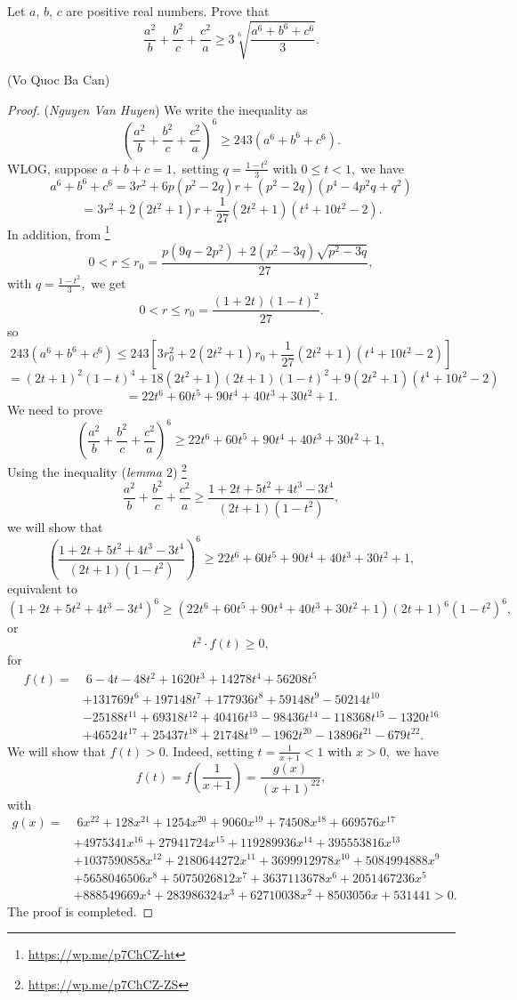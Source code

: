 \documentclass[12pt,a4paper]{book}
\begin{document}
\begin{pro}
Let $a,\,b,\,c$ are positive real numbers. Prove that
\[\frac{a^2}{b}+\frac{b^2}{c}+\frac{c^2}{a} \ge 3\sqrt[6]{\frac{a^6+b^6+c^6}{3}}.\]
\vspace{-1.3cm}
\begin{flushright}(Vo Quoc Ba Can)\end{flushright}
\end{pro}

\begin{proof}
(\textit{Nguyen Van Huyen}) We write the inequality as
\[\left(\frac{a^2}{b}+\frac{b^2}{c}+\frac{c^2}{a}\right)^6 \ge 243(a^6+b^6+c^6).\]
WLOG, suppose $a+b+c=1,$ setting $q=\frac{1-t^2}{3}$ with $0 \le t < 1, $ we have
\[a^6+b^6+c^6=3r^2+6p(p^2-2q)r+(p^2-2q)(p^4-4p^2q+q^2)\]
\[=3r^2+2(2t^2+1)r+\frac{1}{27}(2t^2+1)(t^4+10t^2-2).\]
In addition, from \footnote{\url{https://wp.me/p7ChCZ-ht}}
\[0 < r \leqslant r_0 = \frac{p(9q-2p^2)+2(p^2-3q)\sqrt{p^2-3q}}{27},\]
with $q=\frac{1-t^2}{3},$ we get
\[0 < r \leqslant r_0 = \frac{(1+2t)(1-t)^2}{27}.\]
so
\[243(a^6+b^6+c^6) \leqslant 243\left[3r_0^2+2(2t^2+1)r_0+\frac{1}{27}(2t^2+1)(t^4+10t^2-2)\right]\]
\[=(2t+1)^2(1-t)^4+18(2t^2+1)(2t+1)(1-t)^2+9(2t^2+1)(t^4+10t^2-2)\]
\[=22t^6+60t^5+90t^4+40t^3+30t^2+1.\]
We need to prove
\[\left(\frac{a^2}{b}+\frac{b^2}{c}+\frac{c^2}{a}\right)^6 \ge 22t^6+60t^5+90t^4+40t^3+30t^2+1,\]
Using the inequality (\textit{lemma $2$}) \footnote{\url{https://wp.me/p7ChCZ-ZS}}
\[\frac{a^2}{b}+\frac{b^2}{c}+\frac{c^2}{a} \ge \frac{1+2t+5t^2+4t^3-3t^4}{(2t+1)(1-t^2)},\]
we will show that
\[\left(\frac{1+2t+5t^2+4t^3-3t^4}{(2t+1)(1-t^2)}\right)^6 \ge 22t^6+60t^5+90t^4+40t^3+30t^2+1,\]
equivalent to
\[(1+2t+5t^2+4t^3-3t^4)^6 \ge (22t^6+60t^5+90t^4+40t^3+30t^2+1)(2t+1)^6(1-t^2)^6,\]
or
\[t^2 \cdot f(t) \geq 0,\]
for
\[\begin{aligned}
f(t) = & \; 6-4t-48t^2+1620t^3+14278t^4+56208t^5
\\&+131769t^6+197148t^7+177936t^8+59148t^9-50214t^{10}
\\&-25188t^{11}+69318t^{12}+40416t^{13}-98436t^{14}-118368t^{15}-1320t^{16}
\\&+46524t^{17}+25437t^{18}+21748t^{19}-1962t^{20}-13896t^{21}-679t^{22}.
\end{aligned}\]
We will show that $f(t) >0.$ Indeed, setting $t = \frac{1}{x+1} < 1$ with $x>0,$ we have
\[f(t) = f\left(\frac{1}{x+1}\right)  = \frac{g(x)}{(x+1)^{22}},\]
with
\[\begin{aligned}
g(x) = & \; 6x^{22}+128x^{21}+1254x^{20}+9060x^{19}+74508x^{18}+669576x^{17}
\\&+4975341x^{16}+27941724x^{15}
+119289936x^{14}+395553816x^{13}\\&+1037590858x^{12}+2180644272x^{11}+3699912978x^{10}
+5084994888x^9\\&+5658046506x^8+5075026812x^7+3637113678x^6
+2051467236x^5\\&+888549669x^4+283986324x^3+62710038x^2+8503056x+531441>0.
\end{aligned}\]
The proof is completed.
\end{proof}
\end{document}

